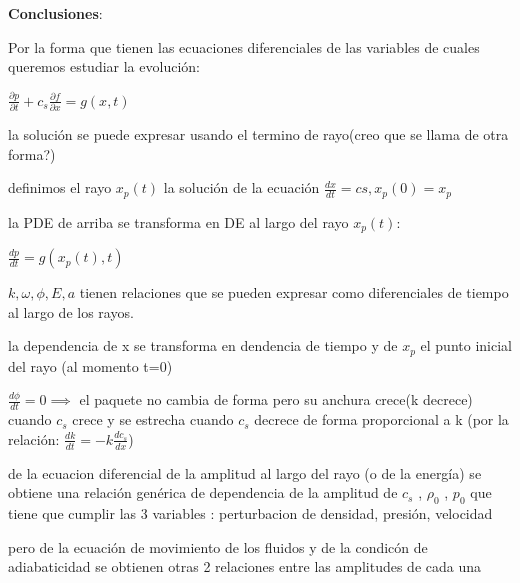 \documentclass{article}
\begin{document}
\textbf{Conclusiones}:
\begin{description}
\item Por la forma que tienen las ecuaciones diferenciales de las variables de cuales queremos estudiar la evolución:
\item $\frac{\partial p}{\partial t} + c_s \frac{\partial f}{\partial x} = g(x,t)$
\item la solución se puede expresar usando el termino de rayo(creo que se llama de otra forma?)
\item definimos el rayo $x_p(t)$ la solución de la ecuación $\frac{dx}{dt} = cs, x_p(0) = x_p$
\item la PDE de arriba se transforma en DE al largo del rayo $x_p(t)$:
\item $\frac{dp}{dt} = g(x_p(t), t)$
\item $k,\omega, \phi, E, a$ tienen relaciones que se pueden expresar como diferenciales de tiempo al largo de los rayos. 
\item la dependencia de x se transforma en dendencia de tiempo y de $x_p$ el punto inicial del rayo (al momento t=0)
\item $\frac{d\phi}{dt} = 0 \implies $ el paquete no cambia de forma pero su anchura crece(k decrece) cuando $ c_s$ crece y se estrecha cuando $c_s$ 
decrece de forma proporcional a k (por la relación: $\frac{dk}{dt} = -k \frac{dc_s}{dx}$)
\item de la ecuacion diferencial de  la amplitud al largo del rayo (o de la energía) se obtiene una relación genérica de dependencia de la amplitud  de $c_s$ , $\rho_0$ , $p_0$ que tiene  que cumplir las 3 variables : perturbacion de densidad, presión, velocidad
\item pero de la ecuación de movimiento de los fluidos y de la condicón de adiabaticidad se obtienen otras 2 relaciones entre las amplitudes de cada una
\end{description}

\newpage 
\end{document}
